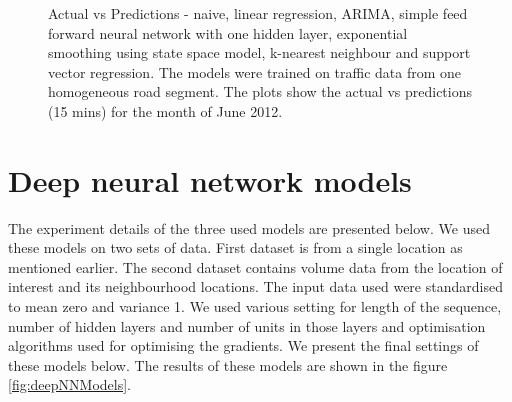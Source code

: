 \begin{figure}[h]
    \qquad

    \caption[Actual vs Predictions, using currently popular methods]{Actual vs Predictions -
    naive, linear regression, ARIMA, simple feed forward neural network with one hidden layer, exponential
    smoothing using state space model, k-nearest neighbour and support vector regression.
    The models were trained on traffic data from one homogeneous road segment. The plots show the
    actual vs predictions (15 mins) for the month of June 2012.}
    \label{fig:comparedModels}
\end{figure}

\section{Deep neural network models}
The experiment details of the three used models are presented below.
We used these models on two sets of data. First dataset is from a single location as mentioned earlier.
The second dataset contains volume data from the location of interest and its neighbourhood locations.
The input data used were standardised to mean zero and variance 1. We used various setting for
length of the sequence, number of hidden layers and number of units in those layers and optimisation
algorithms used for optimising the gradients. We present the final settings of these models below.
The results of these models are shown in the figure \ref{fig:deepNNModels}.

